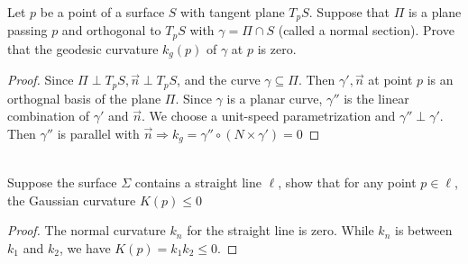\documentclass{article}
\begin{document}
Let $p$ be a point of a surface $S$ with tangent plane $T_p S$. Suppose that $\Pi$ is a plane passing $p$ and orthogonal to $T_pS$ with $\gamma = \Pi \cap S$ (called a normal section). Prove that the geodesic curvature $k_g(p)$
of $\gamma$ at $p$ is zero. 
\begin{proof}
Since $\Pi \perp T_p S, \overrightarrow{n} \perp T_p S$, and the curve $\gamma \subseteq \Pi$. Then $\gamma',\overrightarrow{n}$ at point $p$ is an orthognal basis of the plane $\Pi$. Since $\gamma$ is a planar curve,
$\gamma''$ is the linear combination of $\gamma'$ and $\overrightarrow{n}$. We choose a unit-speed parametrization and $\gamma'' \perp \gamma'$. Then $\gamma''$ is parallel with $\overrightarrow{n}\Rightarrow k_g = \gamma''\circ(N\times \gamma')=0$  
\end{proof}
\quad\\

Suppose the surface $\Sigma$ contains a straight line $\ell$,  show that for any point $p \in \ell$, the Gaussian curvature $K(p)\leq 0$
\begin{proof}
The normal curvature $k_n$ for the straight line is zero. While $k_n$ is between $k_1$ and $k_2$, we have $K(p)=k_1k_2\leq 0$.
\end{proof}
\end{document}
